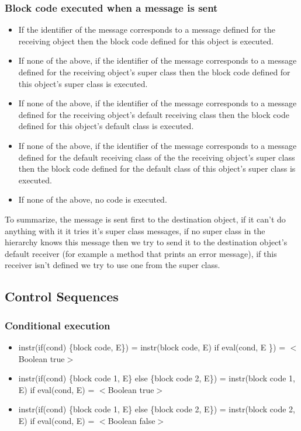 \documentclass{eplDoc}
\begin{document}
\subsubsection{Block code executed when a message is sent}
\begin{itemize}
	\item If the identifier of the message corresponds to a message defined for the receiving object then the block code defined for this object is executed.
	\item If none of the above, if the identifier of the message corresponds to a message defined for the receiving object's super class then the block code defined for this object's super class is executed.
	\item If none of the above, if the identifier of the message corresponds to a message defined for the receiving object's default receiving class then the block code defined for this object's default class is executed.
	\item If none of the above, if the identifier of the message corresponds to a message defined for the default receiving class of the the receiving object's super class then the block code defined for the default class of this object's super class is executed.
	\item If none of the above, no code is executed. 
\end{itemize}

To summarize, the message is sent first to the destination object, if it can't do anything with it it tries it's super class messages, if no super class in the hierarchy knows this message then we try to send it to the destination object's default receiver (for example a method that prints an error message), if this receiver isn't defined we try to use one from the super class. 

\subsection{Control Sequences} 
\subsubsection{Conditional execution}
\begin{itemize}
	\item instr(if(cond) \{block code, E\}) = instr(block code, E) if eval(cond, E \}) = $<$Boolean true$>$
	\item instr(if(cond) \{block code 1, E\} else \{block code 2, E\}) = instr(block code 1, E) if eval(cond, E) = $<$Boolean true$>$  
  \item instr(if(cond) \{block code 1, E\} else \{block code 2, E\}) = instr(block code 2, E) if eval(cond, E) = $<$Boolean false$>$           
                       
\end{itemize}
\end{document}
